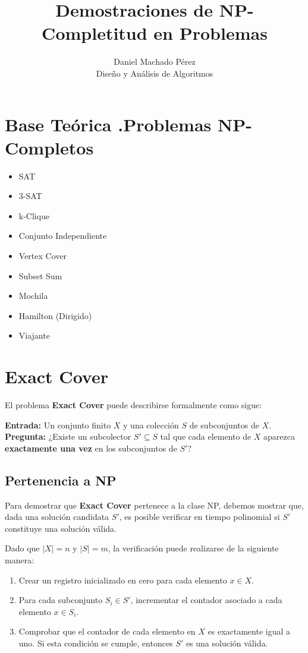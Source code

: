 \documentclass[a4paper,12pt]{article}
\title{\textbf{Demostraciones de NP-Completitud en Problemas}}
\author{Daniel Machado Pérez \\
Diseño y Análisis de Algoritmos}
\date{}
\begin{document}
\maketitle
\tableofcontents
\newpage

\section*{Base Teórica .Problemas NP-Completos}

\begin{itemize}
    \item SAT
    \item 3-SAT
    \item k-Clique
    \item Conjunto Independiente
    \item Vertex Cover
    \item Subset Sum
    \item Mochila
    \item Hamilton (Dirigido)
    \item Viajante
\end{itemize}

\section{Exact Cover}


El problema \textbf{Exact Cover} puede describirse formalmente como sigue: 

\textbf{Entrada:} Un conjunto finito $X$ y una colección $S$ de subconjuntos de $X$.  \\
\textbf{Pregunta:} ¿Existe un subcolector $S' \subseteq S$ tal que cada elemento de $X$ aparezca \textbf{exactamente una vez} en los subconjuntos de $S'$?

\subsection{Pertenencia a NP}
Para demostrar que \textbf{Exact Cover} pertenece a la clase NP, debemos mostrar que, dada una solución candidata $S'$, es posible verificar en tiempo polinomial si $S'$ constituye una solución válida.

Dado que $|X| = n$ y $|S| = m$, la verificación puede realizarse de la siguiente manera:
\begin{enumerate}
    \item Crear un registro inicializado en cero para cada elemento $x \in X$.
    \item Para cada subconjunto $S_i \in S'$, incrementar el contador asociado a cada elemento $x \in S_i$.
    \item Comprobar que el contador de cada elemento en $X$ es exactamente igual a uno. Si esta condición se cumple, entonces $S'$ es una solución válida.
\end{enumerate}
\end{document}
